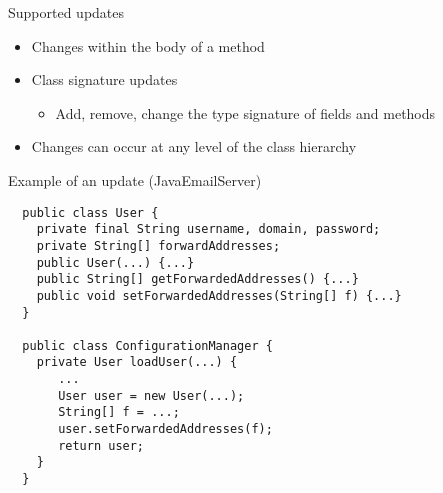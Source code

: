 \begin{frame}{Supported updates}%
\begin{itemize}
\item Changes within the body of a method
\item Class signature updates
  \begin{itemize}
  \item Add, remove, change the type signature of fields and methods
  \end{itemize}
\item Changes can occur at any level of the class hierarchy
\end{itemize}
\end{frame}

\ShowTOC

\newcommand{\ExampleCodeSize}{footnotesize}
\begin{frame}[fragile,shrink=5]{Example of an update (JavaEmailServer)}%
\begin{\ExampleCodeSize}
\begin{verbatim}
  public class User {
    private final String username, domain, password;
    private String[] forwardAddresses;
    public User(...) {...}
    public String[] getForwardedAddresses() {...}
    public void setForwardedAddresses(String[] f) {...}
  }

  public class ConfigurationManager {
    private User loadUser(...) {
       ...
       User user = new User(...);
       String[] f = ...;
       user.setForwardedAddresses(f);
       return user;
    }
  }




\end{verbatim}
\end{\ExampleCodeSize}
\end{frame}

% 
% 

